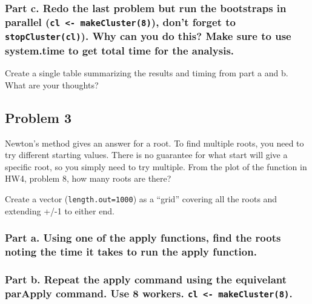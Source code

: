 \documentclass[]{article}
\begin{document}
\hypertarget{part-c.-redo-the-last-problem-but-run-the-bootstraps-in-parallel-cl---makecluster8-dont-forget-to-stopclustercl.-why-can-you-do-this-make-sure-to-use-system.time-to-get-total-time-for-the-analysis.}{%
\subsubsection{\texorpdfstring{Part c. Redo the last problem but run the
bootstraps in parallel (\texttt{cl\ \textless{}-\ makeCluster(8)}),
don't forget to \texttt{stopCluster(cl)}). Why can you do this? Make
sure to use system.time to get total time for the
analysis.}{Part c. Redo the last problem but run the bootstraps in parallel (cl \textless{}- makeCluster(8)), don't forget to stopCluster(cl)). Why can you do this? Make sure to use system.time to get total time for the analysis.}}\label{part-c.-redo-the-last-problem-but-run-the-bootstraps-in-parallel-cl---makecluster8-dont-forget-to-stopclustercl.-why-can-you-do-this-make-sure-to-use-system.time-to-get-total-time-for-the-analysis.}}

Create a single table summarizing the results and timing from part a and
b. What are your thoughts?

\hypertarget{problem-3-2}{%
\subsection{Problem 3}\label{problem-3-2}}

Newton's method gives an answer for a root. To find multiple roots, you
need to try different starting values. There is no guarantee for what
start will give a specific root, so you simply need to try multiple.
From the plot of the function in HW4, problem 8, how many roots are
there?

Create a vector (\texttt{length.out=1000}) as a ``grid'' covering all
the roots and extending +/-1 to either end.

\hypertarget{part-a.-using-one-of-the-apply-functions-find-the-roots-noting-the-time-it-takes-to-run-the-apply-function.}{%
\subsubsection{Part a. Using one of the apply functions, find the roots
noting the time it takes to run the apply
function.}\label{part-a.-using-one-of-the-apply-functions-find-the-roots-noting-the-time-it-takes-to-run-the-apply-function.}}

\hypertarget{part-b.-repeat-the-apply-command-using-the-equivelant-parapply-command.-use-8-workers.-cl---makecluster8.}{%
\subsubsection{\texorpdfstring{Part b. Repeat the apply command using
the equivelant parApply command. Use 8 workers.
\texttt{cl\ \textless{}-\ makeCluster(8)}.}{Part b. Repeat the apply command using the equivelant parApply command. Use 8 workers. cl \textless{}- makeCluster(8).}}\label{part-b.-repeat-the-apply-command-using-the-equivelant-parapply-command.-use-8-workers.-cl---makecluster8.}}
\end{document}

